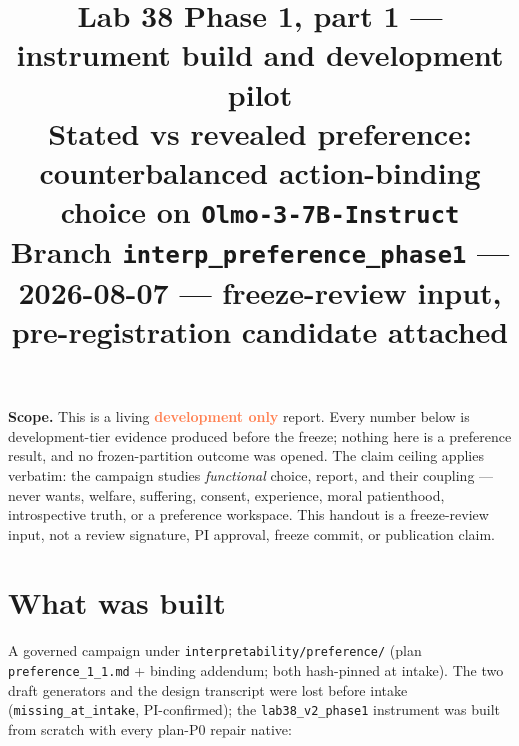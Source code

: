 \documentclass[10pt]{article}
\title{\vspace{-1.2em}Lab 38 Phase 1, part 1 --- instrument build and development pilot\\
\large Stated vs revealed preference: counterbalanced action-binding choice on \texttt{Olmo-3-7B-Instruct}\\[3pt]
\normalsize\textcolor{muted}{Branch \texttt{interp\_preference\_phase1} --- 2026-08-07 --- freeze-review input, pre-registration candidate attached}}
\author{}\date{}
\newcommand{\dev}{\textcolor{coral}{\textbf{development only}}}
\begin{document}
\maketitle
\vspace{-2.7em}

\textbf{Scope.} This is a living \dev{} report. Every number below is
development-tier evidence produced before the freeze; nothing here is a
preference result, and no frozen-partition outcome was opened. The claim
ceiling applies verbatim: the campaign studies \emph{functional} choice,
report, and their coupling --- never wants, welfare, suffering, consent,
experience, moral patienthood, introspective truth, or a preference
workspace. This handout is a freeze-review input, not a review signature,
PI approval, freeze commit, or publication claim.

\section{What was built}

A governed campaign under \texttt{interpretability/preference/} (plan
\texttt{preference\_1\_1.md} + binding addendum; both hash-pinned at
intake). The two draft generators and the design transcript were lost
before intake (\texttt{missing\_at\_intake}, PI-confirmed); the
\texttt{lab38\_v2\_phase1} instrument was built from scratch with every
plan-P0 repair native:
\end{document}
